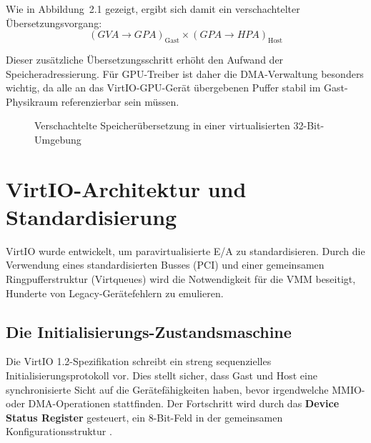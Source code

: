 Wie in Abbildung~2.1 gezeigt, ergibt sich damit ein verschachtelter
Übersetzungsvorgang:
$$ (GVA \to GPA)_{\text{Gast}} \times (GPA \to HPA)_{\text{Host}} $$

Dieser zusätzliche Übersetzungsschritt erhöht den Aufwand der Speicheradressierung.
Für GPU-Treiber ist daher die DMA-Verwaltung besonders wichtig, da alle an das
VirtIO-GPU-Gerät übergebenen Puffer stabil im Gast-Physikraum referenzierbar sein
müssen.

\begin{figure}[ht]
\centering
{}
\caption{Verschachtelte Speicherübersetzung in einer virtualisierten 32-Bit-Umgebung}
\end{figure} 

\section{VirtIO-Architektur und Standardisierung}
VirtIO wurde entwickelt, um paravirtualisierte E/A zu standardisieren. Durch die Verwendung eines standardisierten Busses (PCI) und einer gemeinsamen Ringpufferstruktur (Virtqueues) wird die Notwendigkeit für die VMM beseitigt, Hunderte von Legacy-Gerätefehlern zu emulieren.

\subsection{Die Initialisierungs-Zustandsmaschine}
Die VirtIO 1.2-Spezifikation schreibt ein streng sequenzielles Initialisierungsprotokoll vor. Dies stellt sicher, dass Gast und Host eine synchronisierte Sicht auf die Gerätefähigkeiten haben, bevor irgendwelche MMIO- oder DMA-Operationen stattfinden. Der Fortschritt wird durch das \textbf{Device Status Register} gesteuert, ein 8-Bit-Feld in der gemeinsamen Konfigurationsstruktur \cite{Virtio12}.

